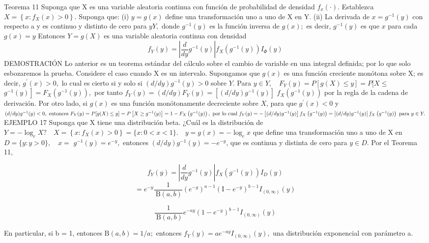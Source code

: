 Teorema 11 Suponga que X es una variable aleatoria continua con función de probabilidad de densidad $f_{x}(\cdot) .$ Establezca $X=\left\{x: f_{X}(x)>0\right\} .$ Suponga que:
(i) $y=g(x)$ define una transformación uno a uno de X en Y. (ii) La derivada de $x=g^{-1}(y)$ con respecto a y es continuo y distinto de cero para $y Y,$ donde $g^{-1}(y)$ es la función inversa de $g(x) ;$ es decir, $g^{-1}(y)$ es que $x$ para cada $g(x)=y$
Entonces $Y=g(X)$ es una variable aleatoria continua con densidad
$$
f_{Y}(y)=\left|\frac{d}{d y} g^{-1}(y)\right| f_{X}\left(g^{-1}(y)\right) I_{\Phi}(y)
$$
DEMOSTRACIÓN Lo anterior es un teorema estándar del cálculo sobre el cambio de variable en una integral definida; por lo que solo esbozaremos la prueba. Considere el caso cuando X es un intervalo. Supongamos que $g(x)$ es una función creciente monótona sobre X; es decir, $g^{\prime}(x)>0,$  lo cual es cierto si y solo si $(d / d y) g^{-1}(y)>0$ sobre $Y .$ Para $y \in Y, \quad F_{Y}(y)=P[g(X) \leq y]=P[X \leq$
$\left.g^{-1}(y)\right]=F_{X}\left(g^{-1}(y)\right),$ por tanto $f_{Y}(y)=(d / d y) F_{Y}(y)=\left[(d / d y) g^{-1}(y)\right]$
$f_{X}\left(g^{-1}(y)\right)$ por la regla de la cadena de derivación. Por otro lado, si $g(x)$ es una función monótonamente decreciente sobre $X$, para que $g^{\prime}(x)<0$ y
$
(d / d y) g^{-1}(y)<0, \text { entonces } F_{Y}(y)=P[g(X) \leq y]=P\left[X \geq g^{-1}(y)\right]=1-F_{X}
\left(g^{-1}(y)\right), \text { por lo cual } f_{Y}(y)=-\left[(d / d y) g^{-1}(y)\right] f_{X}\left(g^{-1}(y)\right)=\left|(d / d y) g^{-1}(y)\right| \\
f_{X}\left(g^{-1}(y)\right) \text { para } y \in Y .
$\\

EJEMPLO 17 Suponga que X tiene una distribución beta. ¿Cuál es la distribución de $ Y=-\log _{e} X ? \quad X=\left\{x: f_{X}(x)>0\right\}=\{x: 0<x<1\} . \quad y=g(x)=-\log _{e} x
$
que define una transformación uno a uno de X en $D=\{y: y>0\}, \quad x=$ $g^{-1}(y)=e^{-y},$ entonces $(d / d y) g^{-1}(y)=-e^{-y}$, que es continua y distinta de cero para $y \in D$.  Por el Teorema 11,
\begin{center}
$$f_{Y}(y) =\left|\frac{d}{d y} g^{-1}(y)\right| f_{X}\left(g^{-1}(y)\right) I_{D}(y)$$
$$=e^{-y} \frac{1}{\mathrm{~B}(a, b)}\left(e^{-y}\right)^{a-1}\left(\mathrm{I}-e^{-y}\right)^{b-1} I_{(0, \infty)}(y)
$$

$$
\frac{1}{\mathrm{~B}(a, b)} e^{-a y}\left(1-e^{-y}\right)^{b-1} I_{(0, \infty)}(y)
$$
\end{center}
En particular, si b = 1, entonces $\mathrm{B}(a, b)=1 / a ;$ entonces $f_{Y}(y)=a e^{-a y} I_{(0, \infty)}(y),$ una distribución exponencial con parámetro a.\\

